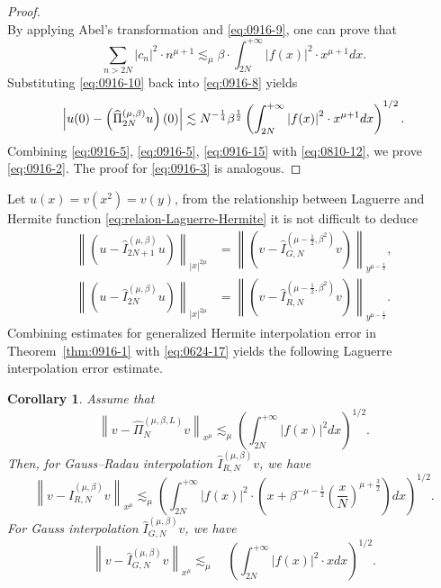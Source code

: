 \documentclass[pdflatex,sn-aps]{sn-jnl}%
\theoremstyle{thmstyleone}%
\newtheorem{corollary}{Corollary}[section]
\theoremstyle{thmstyletwo}%
\theoremstyle{thmstylethree}%
\begin{document}
\begin{proof}
\begin{equation}
  \end{equation}
  By applying Abel's transformation and \eqref{eq:0916-9}, one can prove that
  \begin{equation}\label{eq:0916-10}
    \sum_{n>2 N}\left|c_n\right|^2 \cdot n^{\mu+1} \lesssim_\mu \beta \cdot \int_{2 N}^{+\infty} \left|f(x)\right|^2 \cdot x^{\mu+1} d x.
  \end{equation}
  Substituting \eqref{eq:0916-10} back into \eqref{eq:0916-8} yields
  \begin{equation}\label{eq:0916-15}
    \Bigl|u(0)-\left(\widehat{\Pi}_{2 N}^{(\mu, \beta)} u\right)(0)\Bigr| 
    \lesssim N^{-\frac{1}{4}} \beta^{\frac{1}{2}}\left(\int_{2 N}^{+\infty} \left|f(x)\right|^2 \cdot x^{\mu+1} d x\right)^{1 / 2}.
  \end{equation}
  Combining \eqref{eq:0916-5}, \eqref{eq:0916-5}, \eqref{eq:0916-15} with
  \eqref{eq:0810-12}, we prove \eqref{eq:0916-2}. The proof for \eqref{eq:0916-3}
  is analogous.
\end{proof}

Let $u(x) = v(x^2) = v(y)$,
from the relationship between Laguerre and Hermite function \eqref{eq:relaion-Laguerre-Hermite} it is not 
difficult to deduce
\begin{equation}\label{eq:0624-17}
  \begin{aligned}
  \left\|\left(u-\widehat{I}_{2 N+1}^{(\mu,\beta)} u\right)\right\|_{|x|^{2\mu}}&=\left\|\left(v-\widehat{I}_{G,N}^{(\mu-\frac{1}{2},\beta^2)} v\right)\right\|_{y^{\mu-\frac{1}{2}}}, \\
  \left\|\left(u-\widehat{I}_{2 N}^{(\mu,\beta)} u\right)\right\|_{|x|^{2 \mu}}&=\left\|\left(v-\widehat{I}_{R,N}^{(\mu-\frac{1}{2},\beta^2)} v\right)\right\|_{y^{\mu-\frac{1}{2}}}.
  \end{aligned}
\end{equation}
Combining estimates for generalized Hermite interpolation error in Theorem~\ref{thm:0916-1} with \eqref{eq:0624-17} yields the following Laguerre interpolation error estimate.
\begin{corollary}
  Assume that
  \begin{equation}\label{eq:1111-13}
    \left\|v-\widehat{\Pi}_N^{(\mu, \beta, L)} v\right\|_{x^\mu} \lesssim_\mu\left(\int_{2N}^{+\infty} \left|f(x)\right|^2 d x\right)^{1 / 2}.
  \end{equation}
  Then, for Gauss--Radau interpolation $\widehat{I}_{R, N}^{(\mu, \beta)} v$, we have
  \begin{equation}\label{eq:1111-15}
    \left\|v-\widehat{I}_{R, N}^{(\mu, \beta)} v\right\|_{x^\mu} \lesssim_\mu\left(\int_{2 N}^{+\infty} \left|f(x)\right|^2 \cdot \left(x + \beta^{-\mu-\frac{1}{2}}\left(\frac{x}{N}\right)^{\mu+\frac{3}{2}}\right) d x\right)^{1 / 2}.
  \end{equation}
  For Gauss interpolation $\widehat{I}_{G,N}^{(\mu, \beta)} v$, we have
  \begin{equation}\label{eq:1111-14}
    \left\|v-\widehat{I}_{G,N}^{(\mu, \beta)} v\right\|_{x^\mu} \lesssim_\mu \quad\left(\int_{2 N}^{+\infty} \left|f(x)\right|^2 \cdot x d x\right)^{1 / 2}.
  \end{equation}
\end{corollary}
\end{document}
